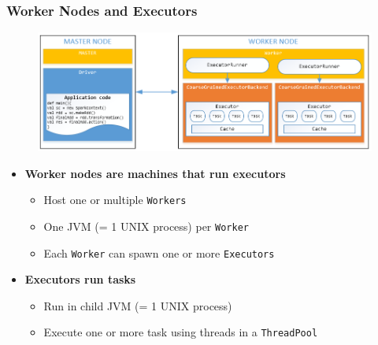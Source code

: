 \begin{frame}
\frametitle{Worker Nodes and Executors}
\begin{figure}[h]
  \centering
  \includegraphics[scale=0.35]{./Figures/spark_worker_executor}
  \label{fig:spark_shuffle_sort}
\end{figure}

\begin{itemize}
	\item {\bf Worker nodes are machines that run executors}
	\begin{itemize}
		\item Host one or multiple \texttt{Workers}
		\item One JVM (= 1 UNIX process) per \texttt{Worker}
		\item Each \texttt{Worker} can spawn one or more \texttt{Executors}
	\end{itemize}

	\item {\bf Executors run tasks}
	\begin{itemize}
		\item Run in child JVM (= 1 UNIX process)
		\item Execute one or more task using threads in a \texttt{ThreadPool}
	\end{itemize}
\end{itemize}
\end{frame}

